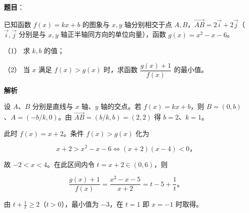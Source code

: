 \begin{answer}

\textbf{题目}：

已知函数 $f(x)=kx+b$ 的图象与 $x,y$ 轴分别相交于点 $A,B$，$\overrightarrow{AB}=2\vec i+2\vec j$（$\vec i,\vec j$ 分别是与 $x,y$ 轴正半轴同方向的单位向量），函数 $g(x)=x^2-x-6$。

（1） 求 $k,b$ 的值；

（2） 当 $x$ 满足 $f(x)>g(x)$ 时，求函数 $\dfrac{g(x)+1}{f(x)}$ 的最小值。

\textbf{解析}


设 $A$、$B$ 分别是直线与 $x$ 轴、$y$ 轴的交点。若 $f(x)=kx+b$，则 $B=(0,b)$、$A=(-b/k,0)$。由 $\overrightarrow{AB}=(b/k,b)=(2,2)$ 得 $b=2$、$k=1$。


此时 $f(x)=x+2$。条件 $f(x)>g(x)$ 化为

\nopagebreak[4]
\[
x+2>x^2-x-6\iff (x+2)(x-4)<0\text{，}
\]

故 $-2<x<4$。在此区间内令 $t=x+2\in(0,6)$，则

\nopagebreak[4]
\[
\frac{g(x)+1}{f(x)}=\frac{x^2-x-5}{x+2}
=t-5+\frac1t\mbox{。}
\]

由 $t+\frac1t\ge2$（$t>0$），最小值为 $-3$，在 $t=1$ 即 $x=-1$ 时取得。



\end{answer}
